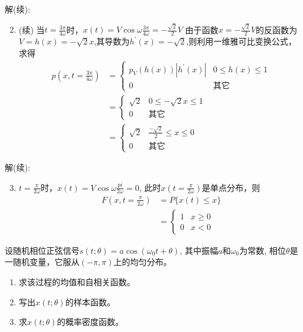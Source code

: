 \begin{frame}
解(续):
\begin{enumerate}
	\setcounter{enumi}{1} %
	\item (续) 当$t=\frac{3\pi}{4\omega}$时，$x(t)=V\cos\omega\frac{3\pi}{4\omega}=-\frac{\sqrt{2}}{2}V$
	由于函数$x=-\frac{\sqrt{2}}{2}V$的反函数为$V=h(x)=-\sqrt{2}x$,其导数为$h^\prime(x)=-\sqrt{2}$,则利用一维雅可比变换公式，求得
	\begin{align*}
		p(x,t=\frac{3\pi}{4\omega}) &=\begin{cases}
		p_V(h(x))|h^\prime(x)| &0\le h(x)\le 1\\
		0 &\text{其它}
		\end{cases}\\
		&=\begin{cases}
		\sqrt{2} &0\le -\sqrt{2}x\le 1\\
		0 &\text{其它}
		\end{cases}\\
		&=\begin{cases}
		\sqrt{2} &\frac{-\sqrt{2}}{2}\le x\le 0\\
		0 &\text{其它}
		\end{cases}
	\end{align*}
\end{enumerate}
\end{frame}

\begin{frame}
解(续):
\begin{enumerate}
	\setcounter{enumi}{2} %
	\item $t=\frac{\pi}{2\omega}$时，$x(t)=V\cos\omega\frac{pi}{2\omega}=0$, 此时$x(t=\frac{\pi}{2\omega})$是单点分布，则
	\begin{align*}
	F(x,t=\frac{\pi}{2\omega}) &=P\{x(t)\le x \}\\
	&=\begin{cases}
	1 &x\ge 0\\
	0 &x<0
	\end{cases}
	\end{align*}
\end{enumerate}
\end{frame}

\begin{frame}
\begin{example}
	设随机相位正弦信号$s(t;\theta)=a\cos(\omega_0 t+\theta)$, 其中振幅$a$和$\omega_0$为常数, 相位$\theta$是一随机变量，它服从$(-\pi,\pi)$上的均匀分布。
	\begin{enumerate}
		\item 求该过程的均值和自相关函数。
		\item 写出$x(t;\theta)$的样本函数。
		\item 求$x(t;\theta)$的概率密度函数。
	\end{enumerate}
\end{example}
\end{frame}

